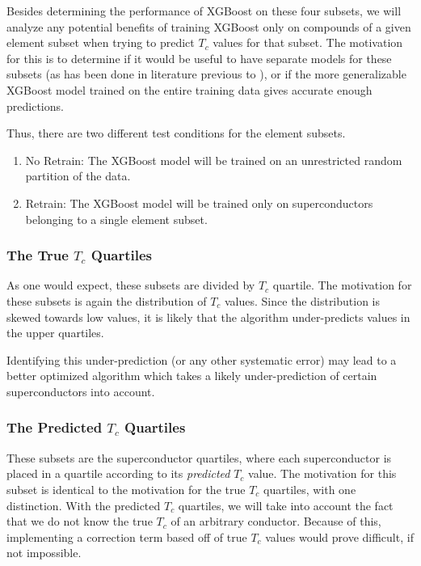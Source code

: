 \documentclass[oneside,12pt]{amsart}
\begin{document}
 Besides determining the performance of XGBoost on these four subsets, we will analyze any potential benefits of training XGBoost only on compounds of a given element subset when trying to predict $T_c$ values for that subset. The motivation for this is to determine if it would be useful to have separate models for these subsets (as has been done in literature previous to \cite{hamidieh_data-driven_2018}), or if the more generalizable XGBoost model trained on the entire training data gives accurate enough predictions.
 
 Thus, there are two different test conditions for the element subsets.
 \begin{enumerate}
 \item No Retrain: The XGBoost model will be trained on an unrestricted random partition of the data.
 \item Retrain: The XGBoost model will be trained only on superconductors belonging to a single element subset.
 \end{enumerate}
 
 \subsubsection{The True $T_c$ Quartiles}
 As one would expect, these subsets are divided by $T_c$ quartile. The motivation for these subsets is again the distribution of $T_c$ values. Since the distribution is skewed towards low values, it is likely that the algorithm under-predicts values in the upper quartiles. 
 
 Identifying this under-prediction (or any other systematic error) may lead to a better optimized algorithm which takes a likely under-prediction of certain superconductors into account.
 
 \subsubsection{The Predicted $T_c$ Quartiles}
 These subsets are the superconductor quartiles, where each superconductor is placed in a quartile according to its \textit{predicted} $T_c$ value. The motivation for this subset is identical to the motivation for the true $T_c$ quartiles, with one distinction. With the predicted $T_c$ quartiles, we will take into account the fact that we do not know the true $T_c$ of an arbitrary conductor. Because of this, implementing a correction term based off of true $T_c$ values would prove difficult, if not impossible.
 
\end{document}
